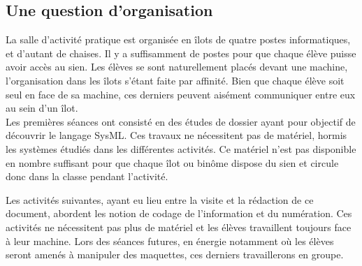 \documentclass[pdftex,a4paper,12pt]{article}
\begin{document}
	\subsection{Une question d'organisation}
	La salle d'activité pratique est organisée en îlots de quatre postes informatiques, et d'autant de chaises.
	Il y a suffisamment de postes pour que chaque élève puisse avoir accès au sien.
	Les élèves se sont naturellement placés devant une machine, l'organisation dans les îlots s'étant faite par affinité.
	Bien que chaque élève soit seul en face de sa machine, ces derniers peuvent aisément communiquer entre eux au sein d'un îlot.\\

	Les premières séances ont consisté en des études de dossier ayant pour objectif de découvrir le langage SysML.
	Ces travaux ne nécessitent pas de matériel, hormis les systèmes étudiés dans les différentes activités.
	Ce matériel n'est pas disponible en nombre suffisant pour que chaque îlot ou binôme dispose du sien et circule donc dans la classe pendant l'activité.

	Les activités suivantes, ayant eu lieu entre la visite et la rédaction de ce document, abordent les notion de codage de l'information et du numération.
	Ces activités ne nécessitent pas plus de matériel et les élèves travaillent toujours face à leur machine.
	Lors des séances futures, en énergie notamment où les élèves seront amenés à manipuler des maquettes, ces derniers travaillerons en groupe.\\
\end{document}
